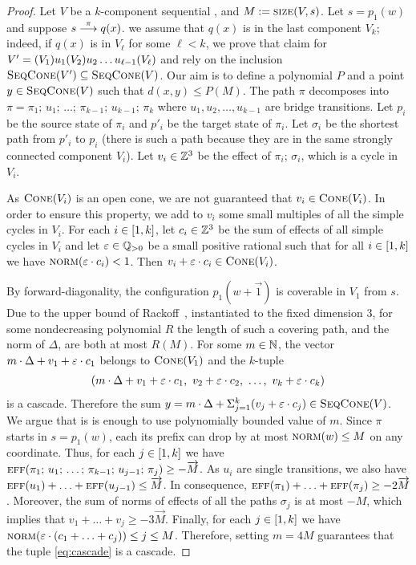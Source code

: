 \begin{proof}
Let $V$ be a $k$-component sequential \tvass, and $M:=\textsc{size}(V, s)$.
Let $s=p_1(w)$ and suppose $s \stackrel{\pi}{\longrightarrow} q(x)$.
\Wlog we assume that $q(x)$ is in the last component $V_k$; indeed, if $q(x)$ is in $V_\ell$ for some
$\ell < k$, we prove that claim for $V'=(V_1) u_1 (V_2) u_2 \ldots u_{\ell-1} (V_\ell)$ and rely on the inclusion
$\textsc{SeqCone}(V') \subseteq \textsc{SeqCone}(V)$.
Our aim is to define a polynomial $P$ and a point $y \in \textsc{SeqCone}(V)$ such that $d(x,y) \leq P(M)$.
The path $\pi$ decomposes into $\pi = \pi_1;\, u_1;\, \ldots; \, \pi_{k-1}; \, u_{k-1}; \, \pi_k$ where 
$u_1, u_2, \ldots, u_{k-1}$ are bridge transitions.
Let $p_i$ be the source state of $\pi_i$ and $p'_i$ be the target state of $\pi_i$.
Let $\sigma_i$ be the shortest path from $p'_i$ to $p_i$ 
(there is such a path because they are in the same strongly connected component $V_i$). 
Let $v_i \in \mathbb{Z}^3$ be the effect of $\pi_i;\, \sigma_i$, which is a cycle in $V_i$. 

As $\textsc{Cone}(V_i)$ is an open cone, we are not guaranteed that $v_i \in \textsc{Cone}(V_i)$. 
In order to ensure this property, we add to $v_i$ some small multiples of all the simple cycles in $V_i$.
For each $i \in [1, k]$, let $c_i\in\mathbb{Z}^3$ 
be the sum of effects of all simple cycles in $V_i$ and let 
$\varepsilon \in \mathbb{Q}_{>0}$ be a small positive rational such that for all $i \in [1, k]$ we have $\textsc{norm}(\varepsilon \cdot c_i) < 1$. 
Then $v_i + \varepsilon \cdot c_i \in \textsc{Cone}(V_i)$.

By forward-diagonality, the configuration $p_1(w+\vec 1)$ is coverable in $V_1$ from $s$.
Due to the upper bound of Rackoff~\cite[Lemma 3.4]{DBLP:journals/tcs/Rackoff78}, instantiated to the
fixed dimension 3,
for some nondecreasing polynomial $R$ the length of such a covering path, and the
norm of $\Delta$, are both at most $R(M)$.
For some $m \in \mathbb{N}$, the vector $m \cdot \Delta + v_1 + \varepsilon \cdot c_1$ 
belongs to $\textsc{Cone}(V_1)$ and the $k$-tuple
\begin{align} \label{eq:cascade}
(m \cdot \Delta + v_1 + \eps \cdot c_1, \ v_2 + \eps \cdot c_2, \ \ldots, \ v_k + \eps \cdot c_k)
\end{align}
is a cascade.
Therefore the sum $y = m \cdot \Delta + \Sigma_{j=1}^k (v_j + \varepsilon\cdot c_j) \in \textsc{SeqCone}(V)$.
%
We argue that is is enough to use polynomially bounded value of $m$.
Since $\pi$ starts in $s=p_1(w)$, each its prefix can drop by at most $\textsc{norm}(w) \leq M$ on any coordinate.
Thus, for each $j \in [1, k]$ we have 
$\textsc{eff}(\pi_1;\, u_1;\, \ldots; \, \pi_{k-1}; \, u_{j-1}; \, \pi_j) \geq -\overrightarrow{M}$.
As $u_i$ are single transitions, we also have
$\textsc{eff}(u_1) + \ldots + \textsc{eff}(u_{j-1}) \leq \overrightarrow{M}$. 
In consequence, $\textsc{eff}(\pi_1) + \ldots + \textsc{eff}(\pi_j) \geq -2\overrightarrow{M}$.
Moreover, the sum of norms of effects of all the paths $\sigma_j$ is at most $-M$, 
which implies that 
$v_1 + \ldots + v_{j} \geq -3\vec{M}$. 
Finally,
for each $j \in [1, k]$ we have 
$\textsc{norm}(\varepsilon \cdot (c_1 + \ldots + c_j)) \leq j \leq M$. 
Therefore, setting $m = 4M$ guarantees that
the tuple \eqref{eq:cascade} is a cascade.


\end{proof}
